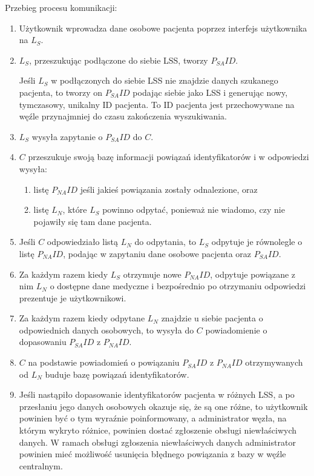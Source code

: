 \documentclass[a4paper]{report}
\begin{document}
Przebieg procesu komunikacji:
\begin{enumerate}
  \item Użytkownik wprowadza dane osobowe pacjenta poprzez interfejs użytkownika na $L_S$.
  \item $L_S$, przeszukując podłączone do siebie LSS, tworzy $P_{SA}ID$.

  Jeśli $L_S$ w podłączonych do siebie LSS nie znajdzie danych szukanego pacjenta, to tworzy on $P_{SA}ID$ podając siebie jako LSS i generując nowy, tymczasowy, unikalny ID pacjenta. To ID pacjenta jest przechowywane na węźle przynajmniej do czasu zakończenia wyszukiwania.
  
  \item $L_S$ wysyła zapytanie o $P_{SA}ID$ do $C$.
  \item $C$ przeszukuje swoją bazę informacji powiązań identyfikatorów i w odpowiedzi wysyła:
    \begin{enumerate}
      \item listę $P_{NA}ID$ jeśli jakieś powiązania zostały odnalezione, oraz
      \item listę $L_N$, które $L_S$ powinno odpytać, ponieważ nie wiadomo, czy nie pojawiły się tam dane pacjenta.
    \end{enumerate}
  \item Jeśli $C$ odpowiedziało listą $L_N$ do odpytania, to $L_S$ odpytuje je równolegle o listę $P_{NA}ID$, podając w zapytaniu dane osobowe pacjenta oraz $P_{SA}ID$.
  \item Za każdym razem kiedy $L_S$ otrzymuje nowe $P_{NA}ID$, odpytuje powiązane z nim $L_N$ o dostępne dane medyczne i bezpośrednio po otrzymaniu odpowiedzi prezentuje je użytkownikowi.
  \item Za każdym razem kiedy odpytane $L_N$ znajdzie u siebie pacjenta o odpowiednich danych osobowych, to wysyła do $C$ powiadomienie o dopasowaniu $P_{SA}ID$ z $P_{NA}ID$.
  \item $C$ na podstawie powiadomień o powiązaniu $P_{SA}ID$ z $P_{NA}ID$ otrzymywanych od $L_N$ buduje bazę powiązań identyfikatorów.
  \item Jeśli nastąpiło dopasowanie identyfikatorów pacjenta w różnych LSS, a po przesłaniu jego danych osobowych okazuje się, że są one różne, to użytkownik powinien być o tym wyraźnie poinformowany, a administrator węzła, na którym wykryto różnice, powinien dostać zgłoszenie obsługi niewłaściwych danych. W ramach obsługi zgłoszenia niewłaściwych danych administrator powinien mieć możliwość usunięcia błędnego powiązania z bazy w węźle centralnym.

\end{enumerate}
\end{document}
